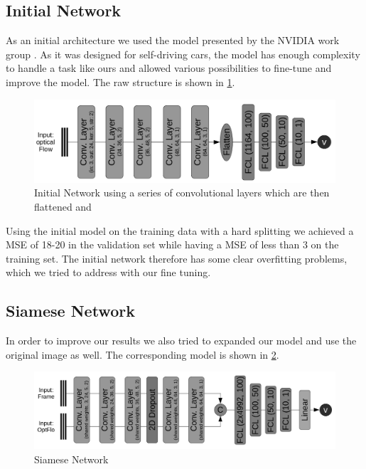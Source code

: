 \documentclass[conference]{IEEEtran}
\begin{document}
\subsection{Initial Network}

As an initial architecture we used the model presented by the NVIDIA work group \cite{NVIDIA2016}. As it was designed for self-driving cars, the model has enough complexity to handle a task like ours and allowed various possibilities to fine-tune and improve the model. The raw structure is shown in \cref{fig:initialNetwork}.

\begin{figure}[ht]
	\centering
	\includegraphics[width=0.9\columnwidth]{imgs/InitialNetwork.png}
	\caption{Initial Network using a series of convolutional layers which are then flattened and }
	\label{fig:initialNetwork}
\end{figure}

Using the initial model on the training data with a hard splitting we achieved a MSE of 18-20 in the validation set while having a MSE of less than 3 on the training set. The initial network therefore has some clear overfitting problems, which we tried to address with our fine tuning.

\subsection{Siamese Network}

In order to improve our results we also tried to expanded our model and use the original image as well. The corresponding model is shown in \cref{fig:siameseNetwork}.

\begin{figure}[ht]
	\centering
	\includegraphics[width=0.9\columnwidth]{imgs/siamese_model.png}
	\caption{Siamese Network}
	\label{fig:siameseNetwork}
\end{figure}
\end{document}
